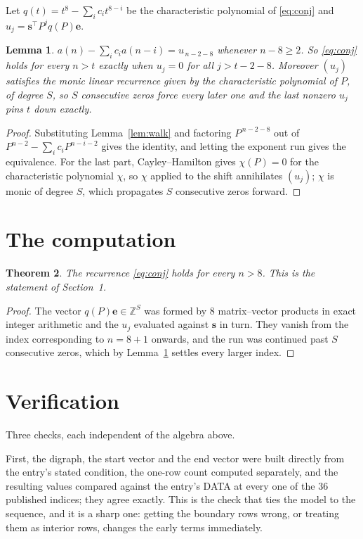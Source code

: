 \documentclass[11pt,a4paper]{article}
\theoremstyle{plain}
\newtheorem{theorem}{Theorem}
\newtheorem{lemma}[theorem]{Lemma}
\theoremstyle{definition}
\begin{document}
Let $q(t)=t^{8}-\sum_i c_i t^{8-i}$ be the characteristic polynomial of
\eqref{eq:conj} and $u_j=\mathbf{s}^{\!\top}P^{j}q(P)\mathbf{e}$.

\begin{lemma}\label{lem:crit}
$a(n)-\sum_i c_i a(n-i)=u_{\,n-2-8}$ whenever $n-8\ge2$. So \eqref{eq:conj}
holds for every $n>t$ exactly when $u_j=0$ for all $j>t-2-8$. Moreover $(u_j)$
satisfies the monic linear recurrence given by the characteristic polynomial of $P$, of
degree $S$, so $S$ consecutive zeros force every later one and the last nonzero $u_j$ pins
$t$ down exactly.
\end{lemma}

\begin{proof}
Substituting Lemma~\ref{lem:walk} and factoring $P^{\,n-2-8}$ out of
$P^{n-2}-\sum_i c_i P^{n-i-2}$ gives the identity, and letting the exponent run gives the
equivalence. For the last part, Cayley--Hamilton gives $\chi(P)=0$ for the characteristic
polynomial $\chi$, so $\chi$ applied to the shift annihilates $(u_j)$; $\chi$ is monic of
degree $S$, which propagates $S$ consecutive zeros forward.
\end{proof}

\section{The computation}

\begin{theorem}
The recurrence \eqref{eq:conj} holds for every $n>8$. This is the statement of
Section~1.
\end{theorem}

\begin{proof}
The vector $q(P)\mathbf{e}\in\mathbb{Z}^{S}$ was formed by $8$ matrix--vector
products in exact integer arithmetic and the $u_j$ evaluated against $\mathbf{s}$ in turn.
They vanish from the index corresponding to $n=8+1$ onwards, and the run was continued
past $S$ consecutive zeros, which by Lemma~\ref{lem:crit} settles every larger index.
\end{proof}

\section{Verification}

Three checks, each independent of the algebra above.

First, the digraph, the start vector and the end vector were built directly from the
entry's stated condition, the one-row count computed separately, and the resulting values
compared against the entry's DATA at every one of the $36$ published indices; they
agree exactly. This is the check that ties the model to the sequence, and it is a sharp one:
getting the boundary rows wrong, or treating them as interior rows, changes the early terms
immediately.
\end{document}
